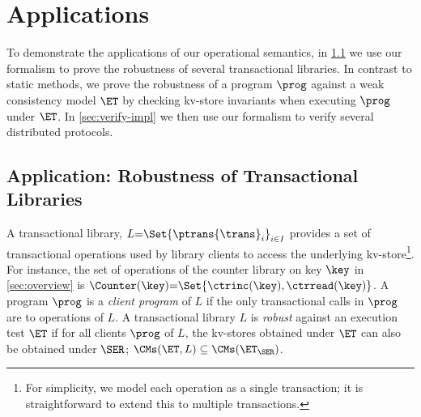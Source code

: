 \section{Applications}
\label{sec:applications}
\label{sec:program-analysis}

To demonstrate the applications of our operational semantics, 
in \cref{sec:robustness} we use our formalism to prove the robustness of several transactional libraries.
In contrast to static methods, we prove the robustness of a program $\prog$ against a weak consistency model \( \ET \)  by checking kv-store invariants when executing $\prog$ under \( \ET \).
In \cref{sec:verify-impl} we then use our formalism to verify several distributed protocols.

\subsection{Application: Robustness of Transactional Libraries}
\label{sec:robustness}
A transactional library, $L {=} \Set{\ptrans{\trans}_{i}}_{i \in I}$
provides a set of transactional operations used by library clients to access the underlying
kv-store\footnote{For simplicity, we model each operation as a single transaction; it is straightforward to extend this to multiple transactions.}. 
For instance, the set of operations of the counter library on key $\key$ in \cref{sec:overview} is $\Counter(\key) {=} \Set{\ctrinc(\key), \ctrread(\key)}$.
A program $\prog$ is a \emph{client program} of $L$ if the only transactional calls in $\prog$ are to operations of $L$.  
A transactional library $L$ is \emph{robust} against an execution test
$\ET$ if for all clients $\prog$ of $L$, the kv-stores obtained under $\ET$ can also be obtained under $\SER$; 
\ie $\CMs(\ET, L) \subseteq \CMs(\ET_{\SER})$. 

